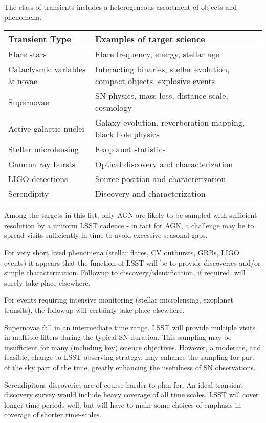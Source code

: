The class of transients includes a heterogeneous assortment of objects and phenomena.

\begin{center} 
\begin{tabular}{| p{5cm} | p{10cm} |}
\hline Transient Type & Examples of target science\\
\hline
Flare stars & Flare frequency, energy, stellar age\\
Cataclysmic variables  \& novae & Interacting binaries, stellar evolution, compact objects, explosive events\\
Supernovae & SN physics, mass loss, distance scale, cosmology\\
Active galactic nuclei & Galaxy evolution, reverberation mapping, black hole physics\\
Stellar microlensing & Exoplanet statistics\\
Gamma ray bursts & Optical discovery and characterization\\
LIGO detections & Source position and characterization\\
Serendipity & Discovery and characterization\\
 \hline \end{tabular} 
 \end{center}	
 
Among the targets in this list, only AGN are likely to be sampled with sufficient resolution by a uniform LSST cadence - in fact for AGN, a challenge may be to spread visits sufficiently in time to avoid excessive seasonal gaps.
 
For very short lived phenomena (stellar flares, CV outbursts, GRBs, LIGO events) it appears that the function of LSST will be to provide discoveries and/or simple characterization.  Followup to discovery/identification, if required, will surely take place elsewhere.  
 
For events requiring intensive monitoring (stellar microlensing, exoplanet transits), the followup will certainly take place elsewhere.

Supernovae fall in an intermediate time range.  LSST will provide multiple visits in multiple filters during the typical SN duration.  This sampling may be insufficient for many (including key) science objectives.  However, a moderate, and feasible, change to LSST observing strategy, may enhance the sampling for part of the sky part of the time, greatly enhancing the usefulness of SN observations.

Serendipitous discoveries are of course harder to plan for.  An ideal transient discovery survey would include heavy coverage of all time scales. LSST will cover longer time periods well, but will have to make some choices of emphasis in coverage of shorter time-scales.



